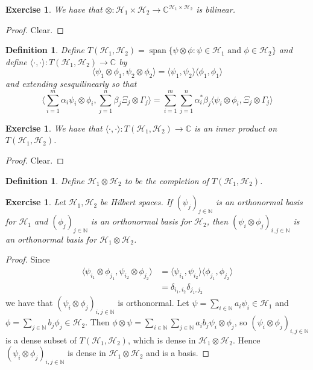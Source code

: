 \documentclass[12pt]{amsart}
\newtheorem{defn}[thm]{Definition}
\newtheorem{ex}[thm]{Exercise}
\renewcommand{\r}{\rangle}
\renewcommand{\l}{\langle}
\newcommand{\al}{\alpha}
\newcommand{\Gam}{\Gamma}
\newcommand{\del}{\delta}
\newcommand{\C}{\mathbb{C}}
\newcommand{\N}{\mathbb{N}}
\newcommand{\MH}{\mathcal{H}}
\DeclareMathOperator{\spn}{span}
\begin{document}
\begin{ex}
	We have that $\otimes: \MH_1 \times \MH_2 \rightarrow \C^{\MH_1 \times \MH_2}$ is bilinear.
\end{ex}

\begin{proof}
	Clear.
\end{proof}

\begin{defn}
	Define $T(\MH_1, \MH_2) = \spn \{\psi \otimes \phi: \psi \in \MH_1 \text{ and } \phi \in \MH_2\}$ and define $\l \cdot, \cdot \r : T(\MH_1, \MH_2) \rightarrow \C $ by $$\l \psi_1 \otimes \phi_1 , \psi_2 \otimes \phi_2 \r = \l \psi_1, \psi_2 \r \l \phi_1 ,  \phi_1\r$$ and extending sesquilinearly so that $$ \l \sum_{i=1}^m \al_i \psi_i \otimes \phi_i , \sum_{j=1}^n \beta_j \Xi_j \otimes \Gam_j\r = \sum_{i=1}^m \sum_{j=1}^n \al_i^* \beta_j \l \psi_i \otimes \phi_i,  \Xi_j \otimes \Gam_j \r$$
\end{defn}

\begin{ex}
	We have that  $\l \cdot, \cdot \r : T(\MH_1, \MH_2) \rightarrow \C $ is an inner product on $T(\MH_1, \MH_2)$.
\end{ex}

\begin{proof} 
	Clear.
\end{proof}

\begin{defn}
	Define $\MH_1 \otimes \MH_2$ to be the completion of $T(\MH_1, \MH_2)$.
\end{defn}
	

	\begin{ex}
		Let $\MH_1, \MH_2$ be Hilbert spaces. If $(\psi_j)_{j\in \N}$ is an orthonormal basis for $\MH_1$ and $(\phi_j)_{j \in \N}$ is an orthonormal basis for $\MH_2$, then $(\psi_i \otimes \phi_j)_{i,j \in \N}$ is an orthonormal basis for $\MH_1 \otimes \MH_2$. 
	\end{ex}

	\begin{proof}
		Since 
		\begin{align*}
			\l \psi_{i_1} \otimes \phi_{j_1} , \psi_{i_2} \otimes \phi_{j_2} \r 
			&= \l \psi_{i_1} , \psi_{i_2} \r \l \phi_{j_1} , \phi_{j_2} \r \\
			&= \del_{i_1, i_2} \del_{j_1, j_2}
		\end{align*}
		we have that $(\psi_i \otimes \phi_j)_{i,j \in \N}$ is orthonormal. Let $\psi = \sum\limits_{i \in \N} a_i \psi_i \in \MH_1$ and $\phi = \sum\limits_{j \in \N} b_j \phi_j \in \MH_2$. Then $\phi \otimes \psi = \sum\limits_{i \in \N} \sum\limits_{j \in \N} a_ib_j \psi_i \otimes \phi_j$, so $(\psi_i \otimes \phi_j)_{i,j \in \N}$ is a dense subset of $T(\MH_1, \MH_2)$, which is dense in $\MH_1 \otimes \MH_2$. Hence $(\psi_i \otimes \phi_j)_{i,j \in \N}$ is dense in $\MH_1 \otimes \MH_2$ and is a basis.
	\end{proof}
\end{document}
